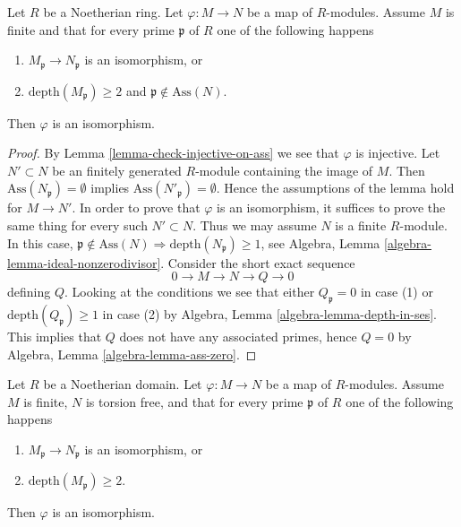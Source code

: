 \begin{lemma}
\label{lemma-check-isomorphism-via-depth-and-ass}
Let $R$ be a Noetherian ring. Let $\varphi : M \to N$ be a map of
$R$-modules. Assume $M$ is finite and that for every prime $\mathfrak p$
of $R$ one of the following happens
\begin{enumerate}
\item $M_\mathfrak p \to N_\mathfrak p$ is an isomorphism, or
\item $\text{depth}(M_\mathfrak p) \geq 2$ and
$\mathfrak p \not \in \text{Ass}(N)$.
\end{enumerate}
Then $\varphi$ is an isomorphism.
\end{lemma}

\begin{proof}
By Lemma \ref{lemma-check-injective-on-ass} we see that $\varphi$ is injective.
Let $N' \subset N$ be an finitely generated $R$-module containing
the image of $M$. Then $\text{Ass}(N_\mathfrak p) = \emptyset$ implies
$\text{Ass}(N'_\mathfrak p) = \emptyset$.
Hence the assumptions of the lemma hold for $M \to N'$.
In order to prove that $\varphi$ is an isomorphism, it suffices
to prove the same thing for every such $N' \subset N$. Thus we may
assume $N$ is a finite $R$-module. In this case,
$\mathfrak p \not \in \text{Ass}(N) \Rightarrow
\text{depth}(N_\mathfrak p) \geq 1$, see
Algebra, Lemma \ref{algebra-lemma-ideal-nonzerodivisor}.
Consider the short exact sequence
$$
0 \to M \to N \to Q \to 0
$$
defining $Q$.
Looking at the conditions we see that either $Q_\mathfrak p = 0$
in case (1) or $\text{depth}(Q_\mathfrak p) \geq 1$ in case (2)
by Algebra, Lemma \ref{algebra-lemma-depth-in-ses}.
This implies that $Q$ does not have any associated primes, hence $Q = 0$ by
Algebra, Lemma \ref{algebra-lemma-ass-zero}.
\end{proof}

\begin{lemma}
\label{lemma-isom-depth-2-torsion-free}
Let $R$ be a Noetherian domain. Let $\varphi : M \to N$ be a map of
$R$-modules. Assume $M$ is finite, $N$ is torsion free, and
that for every prime $\mathfrak p$ of $R$ one of the following happens
\begin{enumerate}
\item $M_\mathfrak p \to N_\mathfrak p$ is an isomorphism, or
\item $\text{depth}(M_\mathfrak p) \geq 2$.
\end{enumerate}
Then $\varphi$ is an isomorphism.
\end{lemma}


